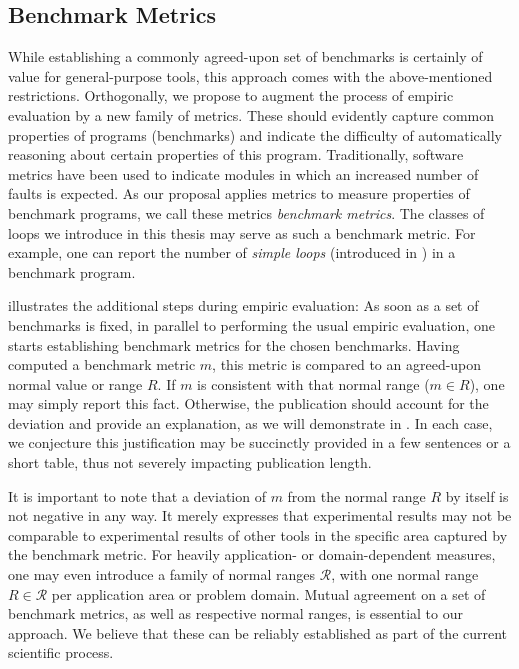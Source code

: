 \subsection{Benchmark Metrics}

While establishing a commonly agreed-upon set of benchmarks is certainly of value for general-purpose tools, this approach comes with the above-mentioned restrictions. Orthogonally, we propose to augment the process of empiric evaluation by a new family of metrics. These should evidently capture common properties of programs (benchmarks) and indicate the difficulty of automatically reasoning about certain properties of this program. Traditionally, software metrics have been used to indicate modules in which an increased number of faults is expected. As our proposal applies metrics to measure properties of benchmark programs, we call these metrics \emph{benchmark metrics}. The classes of loops we introduce in this thesis may serve as such a benchmark metric. For example, one can report the number of \emph{simple loops} (introduced in ) in a benchmark program.

 illustrates the additional steps during empiric evaluation: As soon as a set of benchmarks is fixed, in parallel to performing the usual empiric evaluation, one starts establishing benchmark metrics for the chosen benchmarks. Having computed a benchmark metric $m$, this metric is compared to an agreed-upon normal value or range $R$. If $m$ is consistent with that normal range ($m \in R$), one may simply report this fact. Otherwise, the publication should account for the deviation and provide an explanation, as we will demonstrate in . In each case, we conjecture this justification may be succinctly provided in a few sentences or a short table, thus not severely impacting publication length.

It is important to note that a deviation of $m$ from the normal range $R$ by itself is not negative in any way. It merely expresses that experimental results may not be comparable to experimental results of other tools in the specific area captured by the benchmark metric. For heavily application- or domain-dependent measures, one may even introduce a family of normal ranges $\mathcal{R}$, with one normal range $R \in \mathcal{R}$ per application area or problem domain. Mutual agreement on a set of benchmark metrics, as well as respective normal ranges, is essential to our approach. We believe that these can be reliably established as part of the current scientific process.

